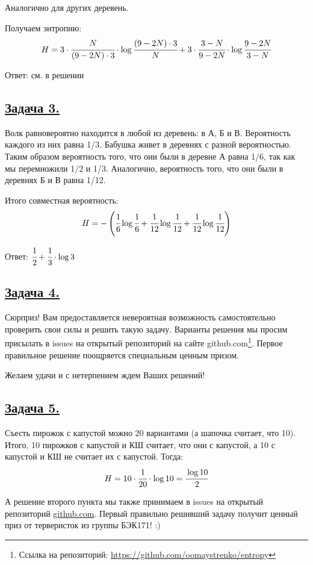 Аналогично для других деревень.

Получаем энтропию:
\[H=3\cdot \cfrac{N}{(9-2N)\cdot3}\cdot \log \cfrac{(9-2N)\cdot3}{N}+3\cdot\cfrac{3-N}{9-2N}\cdot \log \cfrac{9-2N}{3-N}  \]

Ответ: см. в решении

\subsection*{\hyperref[sec:problem3]{Задача 3.}}\label{sec:sol_problem3}

Волк равновероятно находится в любой из деревень: в А, Б и В. Вероятность каждого из них равна 1/3. 
Бабушка живет в деревнях с разной вероятностью. Таким образом вероятность того, что они были в деревне А равна 1/6, так как мы перемножили 1/2 и 1/3. Аналогично, вероятность того, что они были в деревнях Б и В равна 1/12. 

Итого совместная вероятность:
\[H=-  \left(\cfrac{1}{6}\log \cfrac{1}{6} + \cfrac{1}{12}\log \cfrac{1}{12} + \cfrac{1}{12}\log \cfrac{1}{12} \right) \] 

Ответ: $\cfrac{1}{2} + \cfrac{1}{3}\cdot\log3$

\subsection*{\hyperref[sec:problem4]{Задача 4.}}\label{sec:sol_problem4}

Сюрприз! Вам предоставляется невероятная возможность самостоятельно проверить свои силы и решить такую задачу. Варианты решения мы просим присылать в issues на открытый репозиторий на сайте github.com\footnote{Ссылка на репозиторий: \url{https://github.com/oomaystrenko/entropy}}. Первое правильное решение поощряется специальным ценным призом. 

Желаем удачи и с нетерпением ждем Ваших решений!

\subsection*{\hyperref[sec:problem5]{Задача 5.}}\label{sec:sol_problem5}
Съесть пирожок с капустой можно 20 вариантами (а шапочка считает, что 10).
Итого, 10 пирожков с капустой и КШ считает, что они с капустой, а 10 с капустой и КШ не считает их с капустой. 
Тогда:
\[H=10\cdot\cfrac{1}{20}\cdot\log10=\cfrac{\log10}{2}\]

А решение второго пункта мы также принимаем в issues на открытый репозиторий \url{github.com}. Первый правильно решивший задачу получит ценный приз от терверисток из группы БЭК171! :)

